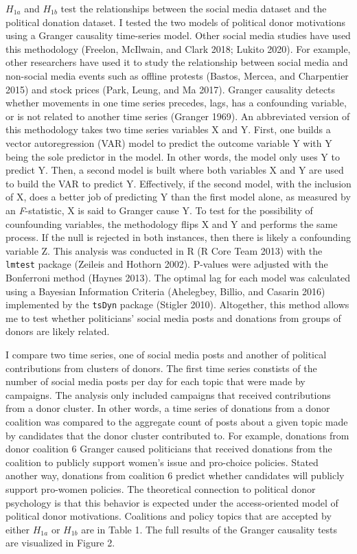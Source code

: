 \documentclass[12pt,]{article}
\begin{document}
\(H_{1a}\) and \(H_{1b}\) test the relationships between the social
media dataset and the political donation dataset. I tested the two
models of political donor motivations using a Granger causality
time-series model. Other social media studies have used this methodology
(Freelon, McIlwain, and Clark 2018; Lukito 2020). For example, other
researchers have used it to study the relationship between social media
and non-social media events such as offline protests (Bastos, Mercea,
and Charpentier 2015) and stock prices (Park, Leung, and Ma 2017).
Granger causality detects whether movements in one time series precedes,
lags, has a confounding variable, or is not related to another time
series (Granger 1969). An abbreviated version of this methodology takes
two time series variables X and Y. First, one builds a vector
autoregression (VAR) model to predict the outcome variable Y with Y
being the sole predictor in the model. In other words, the model only
uses Y to predict Y. Then, a second model is built where both variables
X and Y are used to build the VAR to predict Y. Effectively, if the
second model, with the inclusion of X, does a better job of predicting Y
than the first model alone, as measured by an \emph{F}-statistic, X is
said to Granger cause Y. To test for the possibility of counfounding
variables, the methodology flips X and Y and performs the same process.
If the null is rejected in both instances, then there is likely a
confounding variable Z. This analysis was conducted in R (R Core Team
2013) with the \texttt{lmtest} package (Zeileis and Hothorn 2002).
P-values were adjusted with the Bonferroni method (Haynes 2013). The
optimal lag for each model was calculated using a Bayesian Information
Criteria (Ahelegbey, Billio, and Casarin 2016) implemented by the
\texttt{tsDyn} package (Stigler 2010). Altogether, this method allows me
to test whether politicians' social media posts and donations from
groups of donors are likely related.

I compare two time series, one of social media posts and another of
political contributions from clusters of donors. The first time series
constists of the number of social media posts per day for each topic
that were made by campaigns. The analysis only included campaigns that
received contributions from a donor cluster. In other words, a time
series of donations from a donor coalition was compared to the aggregate
count of posts about a given topic made by candidates that the donor
cluster contributed to. For example, donations from donor coalition 6
Granger caused politicians that received donations from the coalition to
publicly support women's issue and pro-choice policies. Stated another
way, donations from coalition 6 predict whether candidates will publicly
support pro-women policies. The theoretical connection to political
donor psychology is that this behavior is expected under the
access-oriented model of political donor motivations. Coalitions and
policy topics that are accepted by either \(H_{1a}\) or \(H_{1b}\) are
in Table 1. The full results of the Granger causality tests are
visualized in Figure 2.
\end{document}
